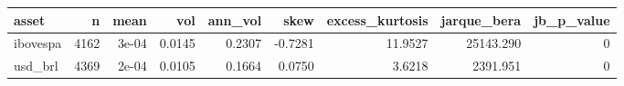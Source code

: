 
\begin{tabular}{lrrrrrrrr}
\toprule
asset & n & mean & vol & ann\_vol & skew & excess\_kurtosis & jarque\_bera & jb\_p\_value\\
\midrule
ibovespa & 4162 & 3e-04 & 0.0145 & 0.2307 & -0.7281 & 11.9527 & 25143.290 & 0\\
usd\_brl & 4369 & 2e-04 & 0.0105 & 0.1664 & 0.0750 & 3.6218 & 2391.951 & 0\\
\bottomrule
\end{tabular}
